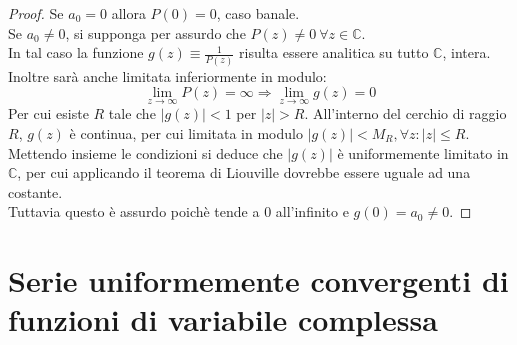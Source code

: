 \documentclass[twoside]{article}
\begin{document}
\begin{proof}
Se $a_0=0$ allora $P(0)=0$, caso banale.\\
Se $a_0\ne0$, si supponga per assurdo che $P(z)\ne 0 \ \forall z \in \mathds{C}$.\\
In tal caso la funzione $g(z)\equiv\frac{1}{P(z)}$ risulta essere analitica su tutto $\mathds{C}$, intera.\\
Inoltre sarà anche limitata inferiormente in modulo:
\begin{equation}
    \lim_{z\to\infty}P(z)=\infty \Longrightarrow \lim_{z\to\infty}g(z)=0
\end{equation}
Per cui esiste $R$ tale che $|g(z)|<1$ per $|z|>R$. All'interno del cerchio di raggio $R$, $g(z)$ è continua, per cui limitata in modulo $|g(z)|<M_R, \forall z : |z|\le R$.\\
Mettendo insieme le condizioni si deduce che $|g(z)|$ è uniformemente limitato in $\mathds{C}$, per cui applicando il teorema di Liouville dovrebbe essere uguale ad una costante.\\
Tuttavia questo è assurdo poichè tende a 0 all'infinito e $g(0)=a_0\ne 0$.
\end{proof}



\newpage
\setcounter{section}{6}
\section{Serie uniformemente convergenti di funzioni di variabile complessa}
\begin{comment}
\begin{wrapfigure}[7]{L}{0.2\textwidth}
  \begin{center}
    \texttt{[image: abel.jpg]}
  \end{center}
\end{wrapfigure}\leavevmode

\epigraph{\'E come la volpe, che confonde con la coda le sue tracce nella sabbia.}{\textit{Niels Abel, parlando di Gauss}}

\epigraph{Cauchy è matto e non c'è modo di essere in buoni rapporti con lui.}{\textit{Niels Abel, parlando di Cauchy}}
\end{comment}
\end{document}
